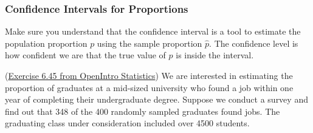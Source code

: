 \documentclass[12pt]{exam}
\newcounter{countA}
\begin{document}
\newpage
\subsubsection*{Confidence Intervals for Proportions}
Make sure you understand that the confidence interval is a tool to estimate the population proportion $p$ using the sample proportion $\hat{p}$.  The confidence level is how confident we are that the true value of $p$ is inside the interval. 

\begin{questions}
\setcounter{question}{\value{countA}}

\question (\href{https://people.hsc.edu/faculty-staff/blins/books/OpenIntroStats4e.pdf#eoce.6.45}{Exercise 6.45 from OpenIntro Statistics}) We are interested in estimating the proportion of graduates at a mid-sized university who found a job within one year of completing their undergraduate degree. Suppose we conduct a
survey and find out that 348 of the 400 randomly sampled graduates found jobs. The graduating class under
consideration included over 4500 students.

\setcounter{countA}{\value{question}}
\end{questions}
\end{document}
